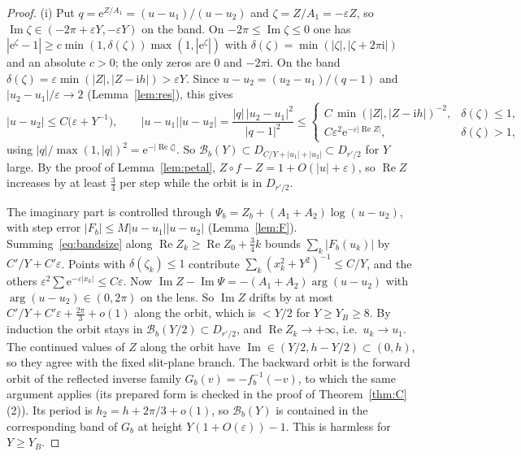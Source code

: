 \documentclass[11pt]{amsart}
\theoremstyle{definition}
\newcommand{\eee}{\mathrm{e}}
\newcommand{\ii}{\mathrm{i}}
\begin{document}
\begin{proof}
(i) Put $q=\eee^{Z/A_1}=(u-u_1)/(u-u_2)$ and $\zeta=Z/A_1=-\varepsilon Z$, so
$\operatorname{Im}\zeta\in(-2\pi+\varepsilon Y,-\varepsilon Y)$ on the band.  On
$-2\pi\le\operatorname{Im}\zeta\le0$ one has
$|\eee^\zeta-1|\ge c\min(1,\delta(\zeta))\max(1,|\eee^\zeta|)$ with
$\delta(\zeta)=\min(|\zeta|,|\zeta+2\pi\ii|)$ and an absolute $c>0$; the only
zeros are $0$ and $-2\pi\ii$.  On the band
$\delta(\zeta)=\varepsilon\min(|Z|,|Z-\ii h|)>\varepsilon Y$.  Since
$u-u_2=(u_2-u_1)/(q-1)$ and $|u_2-u_1|/\varepsilon\to2$
(Lemma~\ref{lem:res}), this gives
\begin{equation}\label{eq:bandsize}
 |u-u_2|\le C\bigl(\varepsilon+Y^{-1}\bigr),\qquad
 |u-u_1||u-u_2|=\frac{|q|\,|u_2-u_1|^2}{|q-1|^2}\le
 \begin{cases}C\,\min(|Z|,|Z-\ii h|)^{-2},&\delta(\zeta)\le1,\\
 C\varepsilon^2\eee^{-\varepsilon|\operatorname{Re}Z|},&\delta(\zeta)>1,\end{cases}
\end{equation}
using $|q|/\max(1,|q|)^2=\eee^{-|\operatorname{Re}\zeta|}$.  So
$\mathcal B_b(Y)\subset D_{C/Y+|u_1|+|u_2|}\subset D_{r'/2}$ for $Y$ large.  By the
proof of Lemma~\ref{lem:petal}, $Z\circ f-Z=1+O(|u|+\varepsilon)$, so
$\operatorname{Re}Z$ increases by at least $\tfrac34$ per step while the orbit is
in $D_{r'/2}$.

The imaginary part is controlled through
$\Psi_b=Z_b+(A_1+A_2)\log(u-u_2)$, with step error
$|F_b|\le M|u-u_1||u-u_2|$ (Lemma~\ref{lem:F}).  Summing~\eqref{eq:bandsize}
along $\operatorname{Re}Z_k\ge\operatorname{Re}Z_0+\tfrac34k$ bounds
$\sum_k|F_b(u_k)|$ by $C'/Y+C'\varepsilon$.  Points with
$\delta(\zeta_k)\le1$ contribute $\sum_k(x_k^2+Y^2)^{-1}\le C/Y$, and the others
$\varepsilon^2\sum\eee^{-\varepsilon|x_k|}\le C\varepsilon$.  Now
$\operatorname{Im}Z-\operatorname{Im}\Psi=-(A_1+A_2)\arg(u-u_2)$ with
$\arg(u-u_2)\in(0,2\pi)$ on the lens.  So $\operatorname{Im}Z$ drifts by at most
$C'/Y+C'\varepsilon+\tfrac{2\pi}3+o(1)$ along the orbit, which is $<Y/2$ for
$Y\ge Y_B\ge8$.  By induction the orbit stays in
$\mathcal B_b(Y/2)\subset D_{r'/2}$, and $\operatorname{Re}Z_k\to+\infty$,
i.e.\ $u_k\to u_1$.  The continued values of $Z$ along the orbit have
$\operatorname{Im}\in(Y/2,h-Y/2)\subset(0,h)$, so they agree with the fixed
slit-plane branch.  The backward orbit is the forward orbit of the reflected
inverse family $G_b(v)=-f_b^{-1}(-v)$, to which the same argument applies
(its prepared form is checked in the proof of Theorem~\ref{thm:C}(2)).  Its
period is $h_2=h+2\pi/3+o(1)$, so $\mathcal B_b(Y)$ is contained in the
corresponding band of $G_b$ at height $Y(1+O(\varepsilon))-1$.  This is harmless
for $Y\ge Y_B$.


\end{proof}
\end{document}
